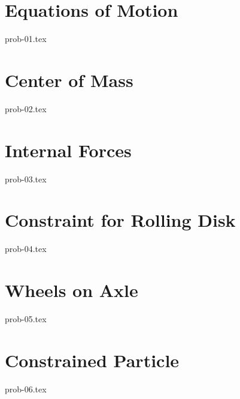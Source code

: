 \section{Equations of Motion}

{prob-01.tex}

\section{Center of Mass}

{prob-02.tex}

\section{Internal Forces}

{prob-03.tex}

\section{Constraint for Rolling Disk}\label{rollingdisk}

{prob-04.tex}

\section{Wheels on Axle}

{prob-05.tex}

\section{Constrained Particle}

{prob-06.tex}

